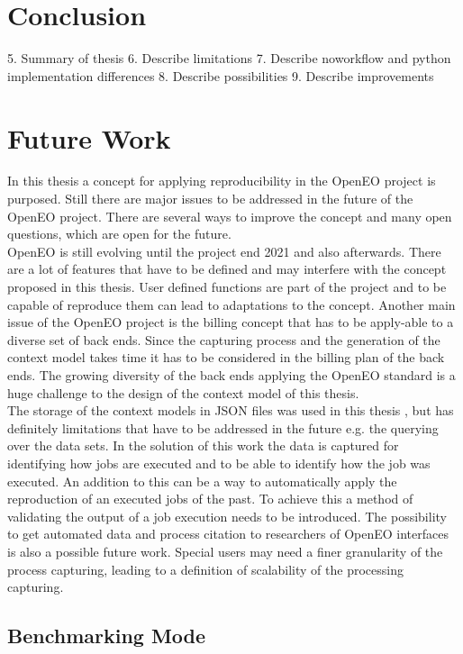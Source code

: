 \documentclass[draft,final]{vutinfth} %
\begin{document}
\section{Conclusion}
5.	Summary of thesis
6.	Describe limitations
7.	Describe noworkflow and python implementation differences 
8.	Describe possibilities
9.	Describe improvements

\section{Future Work}\label{FutureWork}
In this thesis a concept for applying reproducibility in the OpenEO project is purposed. Still there are major issues to be addressed in the future of the OpenEO project. There are several ways to improve the concept and many open questions, which are open for the future. \\
OpenEO is still evolving until the project end 2021 and also afterwards. There are a lot of features that have to be defined and may interfere with the concept proposed in this thesis. User defined functions are part of the project and to be capable of reproduce them can lead to adaptations to the concept. Another main issue of the OpenEO project is the billing concept that has to be apply-able to a diverse set of back ends. Since the capturing process and the generation of the context model takes time it has to be considered in the billing plan of the back ends. The growing diversity of the back ends applying the OpenEO standard is a huge challenge to the design of the context model of this thesis.\\
The storage of the context models in JSON files was used in this thesis , but has definitely limitations that have to be addressed in the future e.g. the querying over the data sets. 
In the solution of this work the data is captured for identifying how jobs are executed and to be able to identify how the job was executed. An addition to this can be a way to automatically apply the reproduction of an executed jobs of the past. To achieve this a method of validating the output of a job execution needs to be introduced. The possibility to get automated data and process citation to researchers of OpenEO interfaces is also a possible future work. Special users may need a finer granularity of the process capturing, leading to a definition of scalability of the processing capturing.      

\subsection{Benchmarking Mode}\label{Job:Benchmarking}
\end{document}
